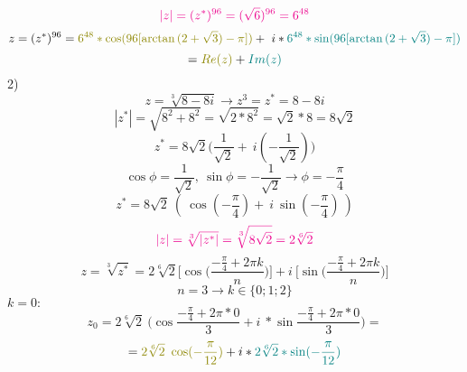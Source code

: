 \documentclass[14pt]{extarticle}
\begin{document}
\begin{displaymath}
    \color{magenta}|z|=(z^*)^{96}=(\sqrt6)^{96}=6^{48}
\end{displaymath}
\begin{displaymath}
    z=(z^*)^{96}= \textcolor{olive}{6^{48} * \cos(96[\arctan{(2+\sqrt3)}-\pi])}
    + \ i * \textcolor{teal}{6^{48} * \sin(96[\arctan{(2+\sqrt3)}-\pi])}
\end{displaymath}
\begin{displaymath}
    = \textcolor{olive}{Re(z)} + \textcolor{teal}{Im(z)}
\end{displaymath}
2)
\begin{displaymath}
    z=\sqrt[3]{8-8i}\rightarrow z^3=z^*=8-8i
\end{displaymath}
\begin{displaymath}
    |z^*|=\sqrt{8^2+8^2}=\sqrt{2*8^2}=\sqrt{2}*8=8\sqrt{2}
\end{displaymath}
\begin{displaymath}
    z^*=8\sqrt{2}\Bigg(\frac{1}{\sqrt{2}}+ \ i (-\frac{1}{\sqrt{2}}) \Bigg)
\end{displaymath}
\begin{displaymath}
    \cos\phi = \frac{1}{\sqrt{2}}, \ 
    \sin\phi =-\frac{1}{\sqrt{2}}\rightarrow\phi=-\frac{\pi}{4}
\end{displaymath}
\begin{displaymath}
    z^*=8\sqrt{2} \ (\ \cos(-\frac{\pi}{4})+ \ 
    i \ \sin(-\frac{\pi}{4}) \ )
\end{displaymath}
\begin{displaymath}
    \color{magenta}|z|=\sqrt[3]{|z^*|}=\sqrt[3]{8\sqrt{2}}=2\sqrt[6]{2}
\end{displaymath}
\begin{displaymath}
    z=\sqrt[3]{z^*}=
    2\sqrt[6]{2}\Bigg[\cos\Biggl(\frac{-\frac{\pi}{4}+2\pi k}{n}\Biggr)\Bigg]
    + i \ \Biggl[\sin\Biggl(\frac{-\frac{\pi}{4}+2\pi k}{n}\Biggr)\Biggr]
\end{displaymath}
\begin{displaymath}
    n=3 \rightarrow k \in \{0;1;2\}
\end{displaymath}
$k=0:$
\begin{displaymath}
    z_0=2\sqrt[6]{2} \ \Biggl(\cos \frac{-\frac{\pi}{4}+2\pi * 0}{3}+
    i \ * \sin \frac{-\frac{\pi}{4}+2\pi * 0}{3}\Biggr)=
\end{displaymath}
\begin{displaymath}
    = \textcolor{olive}{2\sqrt[6]{2} \ \cos (-\frac{\pi}{12})}+
    i * \textcolor{teal}{2\sqrt[6]{2}* \sin (-\frac{\pi}{12})}
\end{displaymath}
\end{document}
